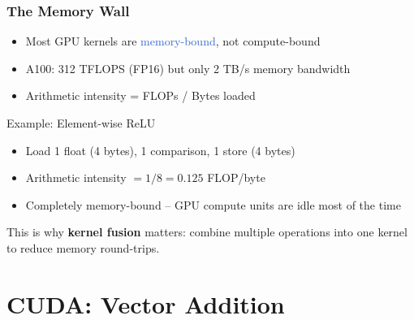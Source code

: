 \documentclass[aspectratio=169]{beamer}
\begin{document}
\begin{frame}
	\frametitle{The Memory Wall}
	\begin{itemize}
		\item Most GPU kernels are \textcolor{highlight}{memory-bound}, not compute-bound
		\item A100: 312 TFLOPS (FP16) but only 2 TB/s memory bandwidth
		\item Arithmetic intensity = FLOPs / Bytes loaded
	\end{itemize}
	\vspace{0.5em}
	\begin{block}{Example: Element-wise ReLU}
		\begin{itemize}
			\item Load 1 float (4 bytes), 1 comparison, 1 store (4 bytes)
			\item Arithmetic intensity $= 1 / 8 = 0.125$ FLOP/byte
			\item Completely memory-bound -- GPU compute units are idle most of the time
		\end{itemize}
	\end{block}
	\vspace{0.5em}
	This is why \textbf{kernel fusion} matters: combine multiple operations into one kernel to reduce memory round-trips.
\end{frame}

\section{CUDA: Vector Addition}
\end{document}
